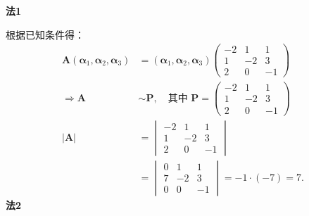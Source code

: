 \begin{solution}
    \textbf{法1}
    
    根据已知条件得：
    \begin{align*}
        \bm{A} (\bm{\alpha}_1, \bm{\alpha}_2,\bm{\alpha}_3) 
        &= (\bm{\alpha}_1, \bm{\alpha}_2,\bm{\alpha}_3)
        \begin{pmatrix}
            -2 & 1  & 1  \\
            1  & -2 & 3  \\
            2  & 0  & -1
        \end{pmatrix} \\
        \Rightarrow \bm{A} &\sim \bm{P}, \quad \text{其中 } \bm{P} = 
        \begin{pmatrix}
            -2 & 1  & 1  \\
            1  & -2 & 3  \\
            2  & 0  & -1
        \end{pmatrix} \\
        \vert\bm{A}\vert &= \begin{vmatrix}
            -2 & 1  & 1  \\
            1  & -2 & 3  \\
            2  & 0  & -1
        \end{vmatrix} \\
        &= \begin{vmatrix}
            0  & 1  & 1  \\
            7  & -2 & 3  \\
            0  & 0  & -1
        \end{vmatrix} = -1 \cdot (-7) = 7.
    \end{align*}
\newpage
    \textbf{法2}
    

\end{solution}
